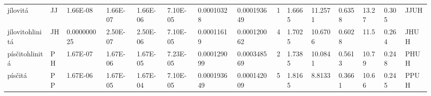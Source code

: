 \begin{sidewaystable}
{\begin{tabular}{lllllllllllllll}
jílovitá        & JJ       & 1.66E-08    & 1.66E-07  & 1.66E-06 & 7.10E-05    & 0.00010328    & 0.000193649 & 1     & 1.6665 & 11.2571 & 0.6358 & 13.27 & 0.305 & JJUH          \\
jílovitohlinitá & JH       & 0.000000025 & 2.50E-07  & 2.50E-06 & 7.10E-05    & 0.00011619    & 0.000120062 & 4     & 1.7025 & 10.6706 & 0.6028 & 11.5  & 0.264 & JHUH          \\
písčitohlinitá  & PH       & 1.67E-07    & 1.67E-06  & 1.67E-05 & 7.23E-05    & 0.000129099   & 0.000348569 & 2     & 1.7385 & 10.0841 & 0.5613 & 10.79 & 0.248 & PHUH          \\
písčitá         & PP       & 1.67E-06    & 1.67E-05  & 1.67E-04 & 7.10E-05    & 0.000193649   & 0.000142009 & 5     & 1.8165 & 8.8133  & 0.3661 & 10.66 & 0.245 & PPUH          \\
\hline
\end{tabular}
}
\end{sidewaystable}